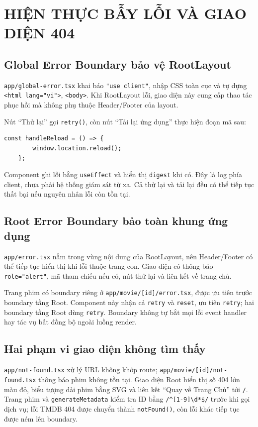 \documentclass[12pt,a4paper]{extarticle}
\begin{document}
\clearpage
\section{HIỆN THỰC BẪY LỖI VÀ GIAO DIỆN 404}
\subsection{Global Error Boundary bảo vệ RootLayout}
\nolinkurl{app/global-error.tsx} khai báo \texttt{"use client"}, nhập CSS toàn cục và tự dựng \texttt{<html lang="vi">}, \texttt{<body>}. Khi RootLayout lỗi, giao diện này cung cấp thao tác phục hồi mà không phụ thuộc Header/Footer của layout.

Nút ``Thử lại'' gọi \texttt{retry()}, còn nút ``Tải lại ứng dụng'' thực hiện đoạn mã sau:
\begin{lstlisting}[caption={Xử lý tải lại tài liệu trong GlobalErrorBoundary}]
    const handleReload = () => {
        window.location.reload();
    };
\end{lstlisting}
Component ghi lỗi bằng \texttt{useEffect} và hiển thị \texttt{digest} khi có. Đây là log phía client, chưa phải hệ thống giám sát từ xa. Cả thử lại và tải lại đều có thể tiếp tục thất bại nếu nguyên nhân lỗi còn tồn tại.

\subsection{Root Error Boundary bảo toàn khung ứng dụng}
\nolinkurl{app/error.tsx} nằm trong vùng nội dung của RootLayout, nên Header/Footer có thể tiếp tục hiển thị khi lỗi thuộc trang con. Giao diện có thông báo \texttt{role="alert"}, mã tham chiếu nếu có, nút thử lại và liên kết về trang chủ.

Trang phim có boundary riêng ở \nolinkurl{app/movie/[id]/error.tsx}, được ưu tiên trước boundary tầng Root. Component này nhận cả \texttt{retry} và \texttt{reset}, ưu tiên \texttt{retry}; hai boundary tầng Root dùng \texttt{retry}. Boundary không tự bắt mọi lỗi event handler hay tác vụ bất đồng bộ ngoài luồng render.

\subsection{Hai phạm vi giao diện không tìm thấy}
\nolinkurl{app/not-found.tsx} xử lý URL không khớp route; \nolinkurl{app/movie/[id]/not-found.tsx} thông báo phim không tồn tại. Giao diện Root hiển thị số 404 lớn màu đỏ, biểu tượng dải phim bằng SVG và liên kết ``Quay về Trang Chủ'' tới \texttt{/}. Trang phim và \texttt{generateMetadata} kiểm tra ID bằng \verb|/^[1-9]\d*$/| trước khi gọi dịch vụ; lỗi TMDB 404 được chuyển thành \texttt{notFound()}, còn lỗi khác tiếp tục được ném lên boundary.
\end{document}
